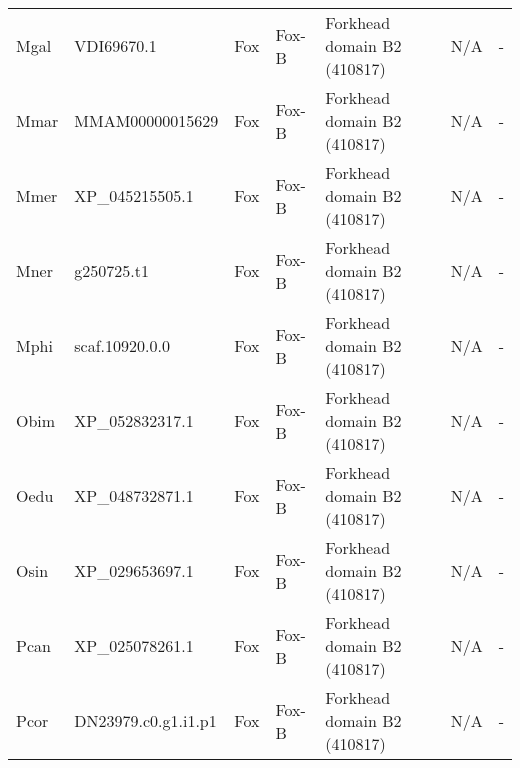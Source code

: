 \documentclass[../main.tex]{subfiles}
\begin{document}
\begin{landscape}
\begin{longtable}{lllllll}
		Mgal           & VDI69670.1            & Fox            & Fox-B               & Forkhead domain B2 (410817)                 & N/A                                                                    & -                    \\
		Mmar           & MMAM00000015629       & Fox            & Fox-B               & Forkhead domain B2 (410817)                 & N/A                                                                    & -                    \\
		Mmer           & XP\_045215505.1       & Fox            & Fox-B               & Forkhead domain B2 (410817)                 & N/A                                                                    & -                    \\
		Mner           & g250725.t1            & Fox            & Fox-B               & Forkhead domain B2 (410817)                 & N/A                                                                    & -                    \\
		Mphi           & scaf.10920.0.0        & Fox            & Fox-B               & Forkhead domain B2 (410817)                 & N/A                                                                    & -                    \\
		Obim           & XP\_052832317.1       & Fox            & Fox-B               & Forkhead domain B2 (410817)                 & N/A                                                                    & -                    \\
		Oedu           & XP\_048732871.1       & Fox            & Fox-B               & Forkhead domain B2 (410817)                 & N/A                                                                    & -                    \\
		Osin           & XP\_029653697.1       & Fox            & Fox-B               & Forkhead domain B2 (410817)                 & N/A                                                                    & -                    \\
		Pcan           & XP\_025078261.1       & Fox            & Fox-B               & Forkhead domain B2 (410817)                 & N/A                                                                    & -                    \\
		Pcor           & DN23979.c0.g1.i1.p1   & Fox            & Fox-B               & Forkhead domain B2 (410817)                 & N/A                                                                    & -                    \\

\end{longtable}
\end{landscape}
\end{document}
